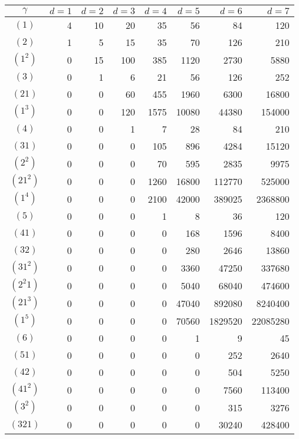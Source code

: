 \documentclass{wstmp}
\begin{document}
\begin{table}[htbp]
{\footnotesize
\begin{tabular}{crrrrrrr}
$\gamma$ &$d= 1 $ &$d= 2 $ &$d= 3 $ &$d= 4 $ &$d= 5
$ &$d= 6 $ &$d= 7 $ \\ 
\hline
$ ( 1 )$ & 4 & 10 & 20 & 35 & 56 & 84 & 120
\\ 
\hline
$ ( 2 )$ & 1 & 5 & 15 & 35 & 70 & 126 & 210
\\ 
$ ( 1 ^{ 2 } )$ & 0 & 15 & 100 & 385 & 1120 &
2730 & 5880 \\ 
\hline
$ ( 3 )$ & 0 & 1 & 6 & 21 & 56 & 126 & 252
\\ 
$ ( 2 1 )$ & 0 & 0 & 60 & 455 & 1960 & 6300
& 16800 \\ 
$ ( 1 ^{ 3 } )$ & 0 & 0 & 120 & 1575 & 10080 &
44380 & 154000 \\ 
\hline
$ ( 4 )$ & 0 & 0 & 1 & 7 & 28 & 84 & 210 \\ 
$ ( 3 1 )$ & 0 & 0 & 0 & 105 & 896 & 4284 &
15120 \\ 
$ ( 2 ^{ 2 } )$ & 0 & 0 & 0 & 70 & 595 & 2835
& 9975 \\ 
$ ( 2 1 ^{ 2 } )$ & 0 & 0 & 0 & 1260 & 16800 &
112770 & 525000 \\ 
$ ( 1 ^{ 4 } )$ & 0 & 0 & 0 & 2100 & 42000 &
389025 & 2368800 \\ 
\hline
$ ( 5 )$ & 0 & 0 & 0 & 1 & 8 & 36 & 120 \\ 
$ ( 4 1 )$ & 0 & 0 & 0 & 0 & 168 & 1596 &
8400 \\ 
$ ( 3 2 )$ & 0 & 0 & 0 & 0 & 280 & 2646 &
13860 \\ 
$ ( 3 1 ^{ 2 } )$ & 0 & 0 & 0 & 0 & 3360 & 47250
& 337680 \\ 
$ ( 2 ^{ 2 } 1 )$ & 0 & 0 & 0 & 0 & 5040 & 68040
& 474600 \\ 
$ ( 2 1 ^{ 3 } )$ & 0 & 0 & 0 & 0 & 47040 &
892080 & 8240400 \\ 
$ ( 1 ^{ 5 } )$ & 0 & 0 & 0 & 0 & 70560 &
1829520 & 22085280 \\ 
\hline
$ ( 6 )$ & 0 & 0 & 0 & 0 & 1 & 9 & 45 \\ 
$ ( 5 1 )$ & 0 & 0 & 0 & 0 & 0 & 252 & 2640
\\ 
$ ( 4 2 )$ & 0 & 0 & 0 & 0 & 0 & 504 & 5250
\\ 
$ ( 4 1 ^{ 2 } )$ & 0 & 0 & 0 & 0 & 0 & 7560
& 113400 \\ 
$ ( 3 ^{ 2 } )$ & 0 & 0 & 0 & 0 & 0 & 315 &
3276 \\ 
$ ( 3 2 1 )$ & 0 & 0 & 0 & 0 & 0 & 30240 &
428400 \\ 

\end{tabular}}
\end{table}
\end{document}
